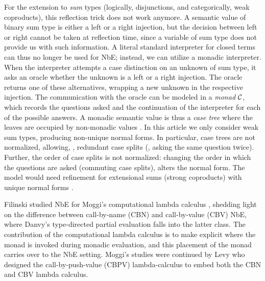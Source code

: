 \documentclass[sigplan,screen,fleqn,review]{acmart} %
\begin{document}
For the extension to \emph{sum} types (logically, disjunctions, and categorically,
weak coproducts), this reflection trick does not work anymore.  A
semantic value of binary sum type is either a left or a right
injection, but the decision between left or right cannot be taken at
reflection time, since a variable of sum type does not provide us with
such information.  A literal standard interpreter for closed terms can
thus no longer be used for NbE;  instead, we can utilize a monadic
interpreter.  When the interpreter attempts a case distinction on an
unknown of sum type, it asks an oracle whether the unknown is a left
or a right injection.  The oracle returns one of these alternatives,
wrapping a new unknown in the respective injection.  The communication with the
oracle can be modeled in a \emph{monad} $\mathcal{C}$,
which records the questions asked and the continuation of the
interpreter for each of the possible answers.
A monadic semantic value is thus a \emph{case tree} where the leaves
are occupied by non-monadic values \cite{altenkirchUustalu:flops04}.
In this article we only consider weak sum types, producing non-unique
normal forms.  In particular, case trees are not normalized, allowing,
\eg, redundant case splits (\ie, asking the same question twice).
Further, the order of case splits is not normalized: changing the
order in which the questions are asked (commuting case splits),
alters the normal form.
The model would need refinement for extensional sums (strong
coproducts) with unique normal forms
\cite{altenkirchDybjerHofmannScott:lics01,altenkirchUustalu:flops04,balatDiCosmoFiore:popl04,barral:PhD,scherer:popl17}.

Filinski \cite{filinski:tlca01} studied NbE for Moggi's computational lambda
calculus \cite{moggi:infcomp91}, shedding light on the difference
between call-by-name (CBN) and call-by-value (CBV) NbE, where Danvy's
type-directed partial evaluation \cite{danvy:popl96} falls into the
latter class.  The contribution of the computational lambda calculus
is to make explicit where the monad is invoked during monadic
evaluation, and this placement of the monad carries over to the NbE
setting.  Moggi's studies were continued by Levy \cite{levy:hosc06}
who designed the call-by-push-value (CBPV) lambda-calculus to embed
both the CBN and CBV lambda calculus.
\end{document}
